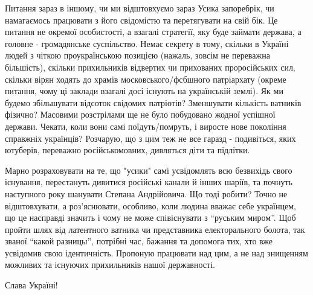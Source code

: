 Питання зараз в іншому, чи ми відштовхуємо зараз Усика запоребрік, чи
намагаємось працювати з його свідомістю та перетягувати на свій бік. Це питання
не окремої особистості, а взагалі стратегії, яку буде займати держава, а
головне - громадянське суспільство. Немає секрету в тому, скільки в Україні
людей з чіткою проукраїнською позицією (нажаль, зовсім не переважна більшість),
скільки прихильників відвертих чи прихованих проросійських сил, скільки вірян
ходять до храмів московського/фсбшного патріархату (окреме питання, чому ці
заклади взагалі досі існують на українській землі). Як ми будемо збільшувати
відсоток свідомих патріотів? Зменшувати кількість ватників фізично? Масовими
розстрілами ще не було побудовано жодної успішної держави. Чекати, коли вони
самі поїдуть/помруть, і виросте нове покоління справжніх українців? Розчарую,
що з цим теж не все гаразд - подивіться, яких ютуберів, переважно
російськомовних, дивляться діти та підлітки.

Марно розраховувати на те, що "усики" самі усвідомлять всю безвихідь свого
існування, перестануть дивитися російські канали й інших шаріїв, та почнуть
наступного року шанувати Степана Андрійовича. Що тоді робити? Точно не
відштовхувати, а роз’яснювати, особливо, коли людина вважає себе українцем, що
це насправді значить і чому не може співіснувати з \enquote{руським миром}. Щоб пройти
шлях від латентного ватника чи представника електорального болота, так званої
\enquote{какой разницы}, потрібні час, бажання та допомога тих, хто вже усвідомив свою
ідентичність. Пропоную працювати над цим, а не над знищенням можливих та
існуючих прихильників нашої державності. 

Слава Україні!
